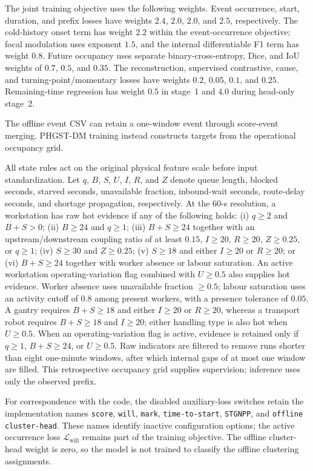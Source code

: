 The joint training objective uses the following weights. Event occurrence, start, duration, and prefix losses have weights $2.4$, $2.0$, $2.0$, and $2.5$, respectively. The cold-history onset term has weight $2.2$ within the event-occurrence objective; focal modulation uses exponent $1.5$, and the internal differentiable F1 term has weight $0.8$. Future occupancy uses separate binary-cross-entropy, Dice, and IoU weights of $0.7$, $0.5$, and $0.35$. The reconstruction, supervised contrastive, cause, and turning-point/momentary losses have weights $0.2$, $0.05$, $0.1$, and $0.25$. Remaining-time regression has weight $0.5$ in stage~1 and $4.0$ during head-only stage~2.

The offline event CSV can retain a one-window event through score-event merging. PHGST-DM training instead constructs targets from the operational occupancy grid.

All state rules act on the original physical feature scale before input standardization. Let $q$, $B$, $S$, $U$, $I$, $R$, and $Z$ denote queue length, blocked seconds, starved seconds, unavailable fraction, inbound-wait seconds, route-delay seconds, and shortage propagation, respectively. At the 60-s resolution, a workstation has raw hot evidence if any of the following holds: (i) $q\geq2$ and $B+S>0$; (ii) $B\geq24$ and $q\geq1$; (iii) $B+S\geq24$ together with an upstream/downstream coupling ratio of at least $0.15$, $I\geq20$, $R\geq20$, $Z\geq0.25$, or $q\geq1$; (iv) $S\geq30$ and $Z\geq0.25$; (v) $S\geq18$ and either $I\geq20$ or $R\geq20$; or (vi) $B+S\geq24$ together with worker absence or labour saturation. An active workstation operating-variation flag combined with $U\geq0.5$ also supplies hot evidence. Worker absence uses unavailable fraction $\geq0.5$; labour saturation uses an activity cutoff of $0.8$ among present workers, with a presence tolerance of $0.05$. A gantry requires $B+S\geq18$ and either $I\geq20$ or $R\geq20$, whereas a transport robot requires $B+S\geq18$ and $I\geq20$; either handling type is also hot when $U\geq0.5$. When an operating-variation flag is active, evidence is retained only if $q\geq1$, $B+S\geq24$, or $U\geq0.5$. Raw indicators are filtered to remove runs shorter than eight one-minute windows, after which internal gaps of at most one window are filled. This retrospective occupancy grid supplies supervision; inference uses only the observed prefix.

For correspondence with the code, the disabled auxiliary-loss switches retain the implementation names \texttt{score}, \texttt{will}, \texttt{mark}, \texttt{time-to-start}, \texttt{STGNPP}, and \texttt{offline cluster-head}. These names identify inactive configuration options; the active occurrence loss $\mathcal{L}_{\mathrm{will}}$ remains part of the training objective. The offline cluster-head weight is zero, so the model is not trained to classify the offline clustering assignments.

